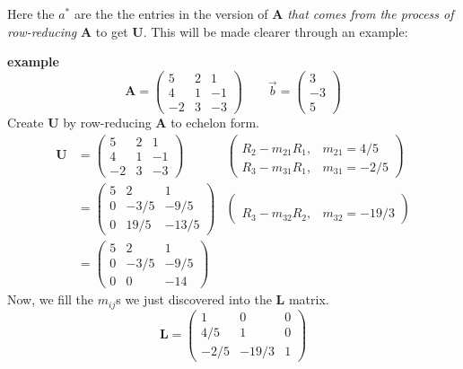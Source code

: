 \documentclass[12pt]{article}
\newcommand{\ve}[1]{\ensuremath{\mathbf{#1}}}
\begin{document}
Here the $a^*$ are the the entries in the version of $\ve{A}$ \textit{that comes from the process of row-reducing} $\ve{A}$ to get $\ve{U}$. This will be made clearer through an example:

\textbf{example}
\begin{equation}
\ve{A} = \begin{pmatrix}
  5  & 2 & 1 \\
  4  & 1 & -1 \\
  -2 & 3 & -3
\end{pmatrix}
\qquad 
\vec{b}= \begin{pmatrix}
3 \\ -3 \\ 5
\end{pmatrix} \nonumber
\end{equation}
%
%
Create $\ve{U}$ by row-reducing $\ve{A}$ to echelon form. 
\begin{align}
\ve{U} &= \begin{pmatrix}
  5  & 2 & 1 \\
  4  & 1 & -1 \\
  -2 & 3 & -3
\end{pmatrix} 
&\begin{pmatrix}
 & \\ R_2 - m_{21}R_1, & m_{21} = 4/5 \\ 
      R_3 - m_{31}R_1, & m_{31} = -2/5 \end{pmatrix} \nonumber \\
%
&= \begin{pmatrix}
  5 & 2    & 1 \\
  0 & -3/5 & -9/5 \\
  0 & 19/5 & -13/5
\end{pmatrix} 
&\begin{pmatrix}
 & \\ & \\ R_3 - m_{32}R_2, & m_{32} = -19/3 \end{pmatrix} \nonumber \\                   
%
&= \begin{pmatrix}
  5 & 2    & 1 \\
  0 & -3/5 & -9/5 \\
  0 & 0    & -14
\end{pmatrix} \nonumber
\end{align}
%
Now, we fill the $m_{ij}$s we just discovered into the $\ve{L}$ matrix.
%
\begin{equation}
\ve{L} = \begin{pmatrix}
  1    & 0     & 0 \\
  4/5  & 1     & 0 \\
  -2/5 & -19/3 & 1
\end{pmatrix} \nonumber
\end{equation}
\end{document}
